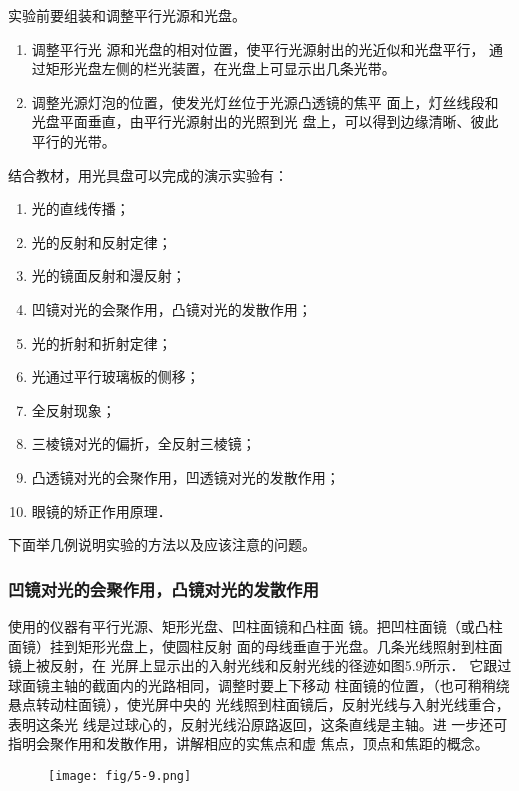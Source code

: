 实验前要组装和调整平行光源和光盘。
\begin{enumerate}
\item 调整平行光
源和光盘的相对位置，使平行光源射出的光近似和光盘平行，
通过矩形光盘左侧的栏光装置，在光盘上可显示出几条光带。
\item 调整光源灯泡的位置，使发光灯丝位于光源凸透镜的焦平
面上，灯丝线段和光盘平面垂直，由平行光源射出的光照到光
盘上，可以得到边缘清晰、彼此平行的光带。
\end{enumerate}

结合教材，用光具盘可以完成的演示实验有：
\begin{enumerate}
    \item 光的直线传播；
    \item 光的反射和反射定律；
    \item 光的镜面反射和漫反射；
    \item 凹镜对光的会聚作用，凸镜对光的发散作用；
    \item 光的折射和折射定律；
    \item 光通过平行玻璃板的侧移；
    \item 全反射现象；
    \item 三棱镜对光的偏折，全反射三棱镜；
    \item 凸透镜对光的会聚作用，凹透镜对光的发散作用；
    \item 眼镜的矫正作用原理．
\end{enumerate}

下面举几例说明实验的方法以及应该注意的问题。

\subsubsection{凹镜对光的会聚作用，凸镜对光的发散作用}

使用的仪器有平行光源、矩形光盘、凹柱面镜和凸柱面
镜。把凹柱面镜（或凸柱面镜）挂到矩形光盘上，使圆柱反射
面的母线垂直于光盘。几条光线照射到柱面镜上被反射，在
光屏上显示出的入射光线和反射光线的径迹如图5.9所示．
它跟过球面镜主轴的截面内的光路相同，调整时要上下移动
柱面镜的位置，（也可稍稍绕悬点转动柱面镜），使光屏中央的
光线照到柱面镜后，反射光线与入射光线重合，表明这条光
线是过球心的，反射光线沿原路返回，这条直线是主轴。进
一步还可指明会聚作用和发散作用，讲解相应的实焦点和虚
焦点，顶点和焦距的概念。

\begin{figure}[htp]
    \centering
    \texttt{[image: fig/5-9.png]}
    \caption{}
\end{figure}

